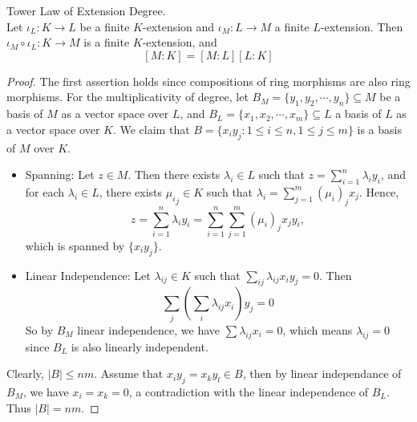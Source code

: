 \documentclass[../book.tex]{subfiles}
\begin{document}
\begin{thm} Tower Law of Extension Degree. \\
Let $\iota_L : K \to L$ be a finite $K$-extension and 
$\iota_M : L \to M$ a finite $L$-extension.
Then $\iota_M \circ \iota_L : K \to M$ is a finite $K$-extension, and 
\[
    [M : K]=[M : L][L : K]
\]
\end{thm}
\begin{proof}
The first assertion holds since compositions 
of ring morphisms are also ring morphisms. 
For the multiplicativity of degree, 
let $B_M=\{y_1,y_2,\cdots,y_n\} \subseteq M$ be a basis of $M$ 
as a vector space over $L$, 
and $B_L=\{x_1,x_2,\cdots,x_m\} \subseteq L$ a basis of $L$ 
as a vector space over $K$.
We claim that $B = \{x_iy_j:1 \leq i \leq n, 1\leq j \leq m\}$ 
is a basis of $M$ over $K$.

\begin{itemize}
    \item Spanning: 
        Let $z \in M$. 
        Then there exists $\lambda_i \in L$ such that 
        $z=\displaystyle\sum_{i=1}^{n} \lambda_iy_i$, 
        and for each $\lambda_i \in L$, there exists ${\mu_i}_j \in K$ 
        such that $\lambda_i=\displaystyle\sum_{j=1}^{m} {(\mu_i)}_j x_j$. 
        Hence,\[
            z = \sum_{i=1}^{n} \lambda_iy_i = 
            \sum_{i=1}^{n} \sum_{j=1}^{m} {(\mu_i)}_j x_j y_i,
        \]
        which is spanned by $\{x_iy_j\}$.
    \item Linear Independence: 
        Let $\lambda_{ij} \in K$ such that 
        $\displaystyle\sum_{ij}\lambda_{ij} x_iy_j=0$. 
        Then \[\sum_j(\sum_i \lambda_{ij} x_i)y_j=0\]
        So by $B_M$ linear independence, 
        we have $\sum \lambda_{ij}x_i=0$, 
        which means $\lambda_{ij}=0$ 
        since $B_L$ is also linearly independent.
\end{itemize}
Clearly, $|B| \leq nm$. Assume that $x_i y_j = x_k y_l \in B$, 
then by linear independance of $B_M$, 
we have $x_i = x_k = 0$, a contradiction with the linear independence of $B_L$. 
Thus $|B| = nm$.
\end{proof}
\end{document}
